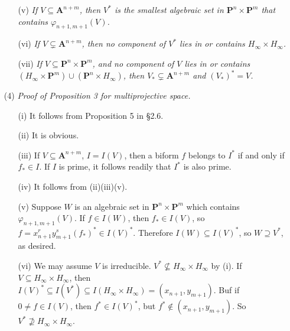 \documentclass{article}
\begin{document}
\begin{enumerate}
\begin{enumerate}
  \item[(v)]
    \emph{If $V \subseteq \mathbf{A}^{n+m}$,
    then $V^{*}$ is the smallest algebraic set in $\mathbf{P}^{n} \times \mathbf{P}^{m}$
    that contains $\varphi_{n+1,m+1}(V)$.}

  \item[(vi)]
    \emph{If $V \subsetneq \mathbf{A}^{n+m}$,
    then no component of $V^{*}$ lies in or contains
    $H_{\infty} \times H_{\infty}$.}

  \item[(vii)]
    \emph{If $V \subseteq \mathbf{P}^{n} \times \mathbf{P}^{m}$,
    and no component of $V$ lies in or contains
    $(H_{\infty} \times \mathbf{P}^{m}) \cup (\mathbf{P}^{n} \times H_{\infty})$,
    then $V_{*} \subsetneq \mathbf{A}^{n+m}$ and $(V_{*})^{*} = V$.}
  \end{enumerate}

\item[(4)]
  \emph{Proof of Proposition 3 for multiprojective space.}
  \begin{enumerate}
  \item[(i)]
    It follows from Proposition 5 in \S 2.6.

  \item[(ii)]
    It is obvious.

  \item[(iii)]
    If $V \subseteq \mathbf{A}^{n+m}$, $I = I(V)$, then a biform $f$ belongs to
    $I^{*}$ if and only if $f_{*} \in I$.
    If $I$ is prime, it follows readily that $I^{*}$ is also prime.

  \item[(iv)]
    It follows from (ii)(iii)(v).

  \item[(v)]
    Suppose $W$ is an algebraic set in $\mathbf{P}^{n} \times \mathbf{P}^{m}$
    which contains $\varphi_{n+1,m+1}(V)$.
    If $f \in I(W)$, then $f_{*} \in I(V)$, so
    $f = x_{n+1}^{r} y_{m+1}^{s}(f_{*})^{*} \in I(V)^{*}$.
    Therefore $I(W) \subseteq I(V)^{*}$, so $W \supseteq V^{*}$, as desired.

  \item[(vi)]
    We may assume $V$ is irreducible.
    $V^{*} \not\subseteq H_{\infty} \times H_{\infty}$ by (i).
    If $V \subseteq H_{\infty} \times H_{\infty}$,
    then $I(V)^{*} \subseteq I(V^{*}) \subseteq I(H_{\infty} \times H_{\infty}) = (x_{n+1},y_{m+1})$.
    Buf if $0 \neq f \in I(V)$, then $f^{*} \in I(V)^{*}$, but $f^{*} \not\in (x_{n+1},y_{m+1})$.
    So $V^{*} \not\supseteq H_{\infty} \times H_{\infty}$.


\end{enumerate}
\end{enumerate}
\end{document}
